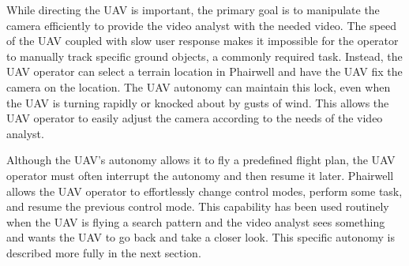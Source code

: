 \documentclass[letterpaper]{article}
\begin{document}
While directing the UAV is important, the primary goal is to manipulate the camera efficiently to provide the video analyst with the needed video. The speed of the UAV coupled with slow user response makes it impossible for the operator to manually track specific ground objects, a commonly required task. Instead, the UAV operator can select a terrain location in Phairwell and have the UAV fix the camera on the location. The UAV autonomy can maintain this lock, even when the UAV is turning rapidly or knocked about by gusts of wind. This allows the UAV operator to easily adjust the camera according to the needs of the video analyst.



Although the UAV's autonomy allows it to fly a predefined flight plan, the UAV operator must often interrupt the autonomy and then resume it later. Phairwell allows the UAV operator to effortlessly change control modes, perform some task, and resume the previous control mode. This capability has been used routinely when the UAV is flying a search pattern and the video analyst sees something and wants the UAV to go back and take a closer look. This specific autonomy is described more fully in the next section.
\end{document}
